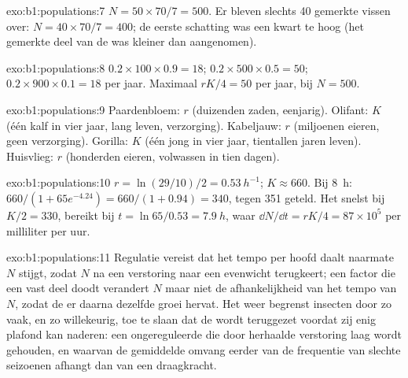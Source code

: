 \begin{solution}{exo:b1:populations:7}
$N = 50\times 70/7 = 500$. Er bleven slechts 40 gemerkte vissen over: $N = 40\times
70/7 = 400$; de eerste schatting was een kwart te hoog (het gemerkte deel
van de  was kleiner dan aangenomen).
\end{solution}

\begin{solution}{exo:b1:populations:8}
$0.2\times 100\times 0.9 = 18$; $0.2\times 500\times 0.5 = 50$;
$0.2\times 900\times 0.1 = 18$ per jaar. Maximaal $rK/4 = 50$ per jaar, bij
$N = 500$.
\end{solution}

\begin{solution}{exo:b1:populations:9}
Paardenbloem: $r$ (duizenden zaden, eenjarig). Olifant: $K$ (één kalf in
vier jaar, lang leven, verzorging). Kabeljauw: $r$ (miljoenen eieren, geen
verzorging). Gorilla: $K$ (één jong in vier jaar, tientallen jaren leven).
Huisvlieg: $r$ (honderden eieren, volwassen in tien dagen).
\end{solution}

\begin{solution}{exo:b1:populations:10}
$r = \ln(29/10)/2 = \qty{0.53}{h^{-1}}$; $K \approx 660$. Bij \qty{8}{h}:
$660/(1 + 65e^{-4.24}) = 660/(1 + 0.94) = 340$, tegen 351 geteld. Het
snelst bij $K/2 = 330$, bereikt bij $t = \ln 65/0.53 = \qty{7.9}{h}$, waar
$\dd N/\dd t = rK/4 = 87\times 10^5$  per milliliter per
uur.
\end{solution}

\begin{solution}{exo:b1:populations:11}
Regulatie vereist dat het tempo per hoofd daalt naarmate $N$ stijgt, zodat
$N$ na een verstoring naar een evenwicht terugkeert; een factor die een vast
deel doodt verandert $N$ maar niet de afhankelijkheid van het tempo van $N$,
zodat de  er daarna dezelfde groei hervat. Het weer begrenst
insecten door zo vaak, en zo willekeurig, toe te slaan dat de 
wordt teruggezet voordat zij enig plafond kan naderen: een ongereguleerde
 die door herhaalde verstoring laag wordt gehouden, en waarvan de
gemiddelde omvang eerder van de frequentie van slechte seizoenen afhangt dan
van een draagkracht.
\end{solution}

